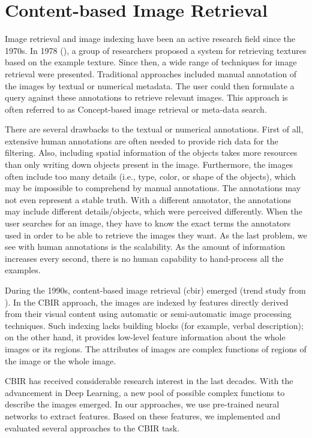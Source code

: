\chapter{Content-based Image Retrieval}
\label{ch:preliminaries}
\label{ch:content_based}

Image retrieval and image indexing have been an active research field since the 1970s. In 1978 (\cite{tamura1978textural}), a group of researchers proposed a system for retrieving textures based on the example texture. Since then, a wide range of techniques for image retrieval were presented. Traditional approaches included manual annotation of the images by textual or numerical metadata. The user could then formulate a query against these annotations to retrieve relevant images. This approach is often referred to as Concept-based image retrieval or meta-data search.

There are several drawbacks to the textual or numerical annotations. First of all, extensive human annotations are often needed to provide rich data for the filtering. Also, including spatial information of the objects takes more resources than only writing down objects present in the image. Furthermore, the images often include too many details (i.e., type, color, or shape of the objects), which may be impossible to comprehend by manual annotations.  The annotations may not even represent a stable truth. With a different annotator, the annotations may include different details/objects, which were perceived differently. When the user searches for an image, they have to know the exact terms the annotators used in order to be able to retrieve the images they want. As the last problem, we see with human annotations is the scalability. As the amount of information increases every second, there is no human capability to hand-process all the examples.

During the 1990s, content-based image retrieval (\acrshort{cbir}) emerged (trend study from \cite{datta2008image}). In the CBIR approach, the images are indexed by features directly derived from their visual content using automatic or semi-automatic image processing techniques. Such indexing lacks building blocks (for example, verbal description); on the other hand, it provides low-level feature information about the whole images or its regions. The attributes of images are complex functions of regions of the image or the whole image.

CBIR has received considerable research interest in the last decades. With the advancement in Deep Learning, a new pool of possible complex functions to describe the images emerged. In our approaches, we use pre-trained neural networks to extract features. Based on these features, we implemented and evaluated several approaches to the CBIR task.

